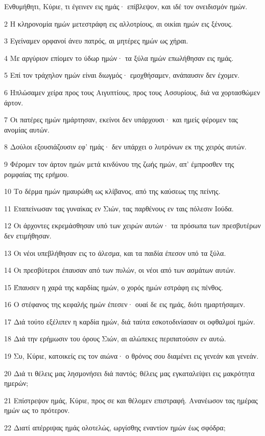 \par Ενθυμήθητι, Κύριε, τι έγεινεν εις ημάς· επίβλεψον, και ιδέ τον ονειδισμόν ημών.
\par 2 Η κληρονομία ημών μετεστράφη εις αλλοτρίους, αι οικίαι ημών εις ξένους.
\par 3 Εγείναμεν ορφανοί άνευ πατρός, αι μητέρες ημών ως χήραι.
\par 4 Με αργύριον επίομεν το ύδωρ ημών· τα ξύλα ημών επωλήθησαν εις ημάς.
\par 5 Επί τον τράχηλον ημών είναι διωγμός· εμοχθήσαμεν, ανάπαυσιν δεν έχομεν.
\par 6 Ηπλώσαμεν χείρα προς τους Αιγυπτίους, προς τους Ασσυρίους, διά να χορτασθώμεν άρτον.
\par 7 Οι πατέρες ημών ημάρτησαν, εκείνοι δεν υπάρχουσι· και ημείς φέρομεν τας ανομίας αυτών.
\par 8 Δούλοι εξουσιάζουσιν εφ' ημάς· δεν υπάρχει ο λυτρόνων εκ της χειρός αυτών.
\par 9 Φέρομεν τον άρτον ημών μετά κινδύνου της ζωής ημών, απ' έμπροσθεν της ρομφαίας της ερήμου.
\par 10 Το δέρμα ημών ημαυρώθη ως κλίβανος, από της καύσεως της πείνης.
\par 11 Εταπείνωσαν τας γυναίκας εν Σιών, τας παρθένους εν ταις πόλεσιν Ιούδα.
\par 12 Οι άρχοντες εκρεμάσθησαν υπό των χειρών αυτών· τα πρόσωπα των πρεσβυτέρων δεν ετιμήθησαν.
\par 13 Οι νέοι υπεβλήθησαν εις το άλεσμα, και τα παιδία έπεσον υπό τα ξύλα.
\par 14 Οι πρεσβύτεροι έπαυσαν από των πυλών, οι νέοι από των ασμάτων αυτών.
\par 15 Έπαυσεν η χαρά της καρδίας ημών, ο χορός ημών εστράφη εις πένθος.
\par 16 Ο στέφανος της κεφαλής ημών έπεσεν· ουαί δε εις ημάς, διότι ημαρτήσαμεν.
\par 17 Διά τούτο εξέλιπεν η καρδία ημών, διά ταύτα εσκοτοδινίασαν οι οφθαλμοί ημών.
\par 18 Διά την ερήμωσιν του όρους Σιών, αι αλώπεκες περιπατούσιν εν αυτώ.
\par 19 Συ, Κύριε, κατοικείς εις τον αιώνα· ο θρόνος σου διαμένει εις γενεάν και γενεάν.
\par 20 Διά τι θέλεις μας λησμονήσει διά παντός; θέλεις μας εγκαταλείψει εις μακρότητα ημερών;
\par 21 Επίστρεψον ημάς, Κύριε, προς σε και θέλομεν επιστραφή. Ανανέωσον τας ημέρας ημών ως το πρότερον.
\par 22 Διατί απέρριψας ημάς ολοτελώς, ωργίσθης εναντίον ημών έως σφόδρα;


